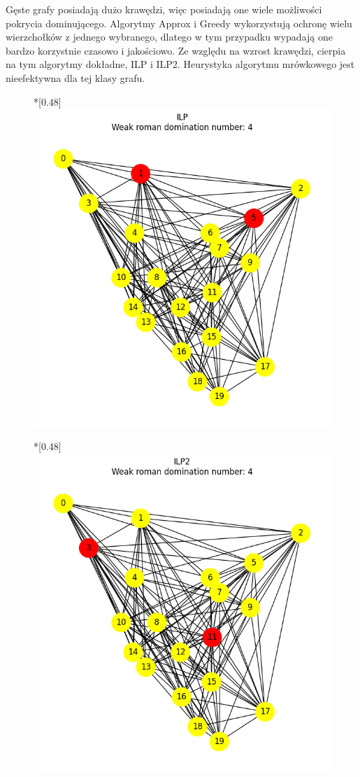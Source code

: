     Gęste grafy posiadają dużo krawędzi, więc posiadają one wiele możliwości pokrycia dominującego. Algorytmy Approx i Greedy wykorzystują ochronę wielu wierzchołków z jednego wybranego, dlatego w tym przypadku wypadają one bardzo korzystnie czasowo i jakościowo. Ze względu na wzrost krawędzi, cierpia na tym algorytmy dokładne, ILP i ILP2. Heurystyka algorytmu mrówkowego jest nieefektywna dla tej klasy grafu.

    \begin{figure}[htbp]
        \centering
        \begin{subcaptionbox}*{}[0.48\linewidth]
            {\includegraphics[width=0.75\linewidth]{assets/plots/ILP/ErdosRenyi_dense_n20_i2_results.png}}
        \end{subcaptionbox}
        \hfill
        \begin{subcaptionbox}*{}[0.48\linewidth]
            {\includegraphics[width=0.75\linewidth]{assets/plots/ILP2/ErdosRenyi_dense_n20_i2_results.png}}

\end{subcaptionbox}
\end{figure}
